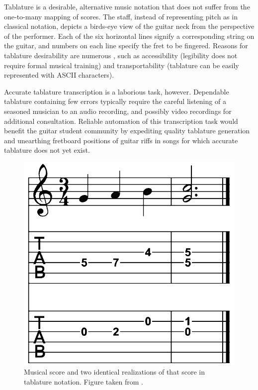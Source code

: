 \documentclass[convention,peer-reviewed]{aesconf}
\begin{document}
Tablature is a desirable, alternative music notation that does not suffer from the one-to-many mapping of scores. The staff, instead of representing pitch as in classical notation, depicts a birds-eye view of the guitar neck from the perspective of the performer. Each of the six horizontal lines signify a corresponding string on the guitar, and numbers on each line specify the fret to be fingered. Reasons for tablature desirability are numerous \citep{macrae2010}, such as accessibility (legibility does not require formal musical training) and transportability (tablature can be easily represented with ASCII characters). 

Accurate tablature transcription is a laborious task, however. Dependable tablature containing few errors typically require the careful listening of a seasoned musician to an audio recording, and possibly video recordings for additional consultation. Reliable automation of this transcription task would benefit the guitar student community by expediting quality tablature generation and unearthing fretboard positions of guitar riffs in songs for which accurate tablature does not yet exist.
\begin{figure}[!htbp] 
\centering
\includegraphics[scale=0.2]{figs/score-tabs}
\caption{Musical score and two identical realizations of that score in tablature notation. Figure taken from \citep{barbanchoi2012}.}
\label{fig:score-tabs}
\end{figure}
\end{document}
